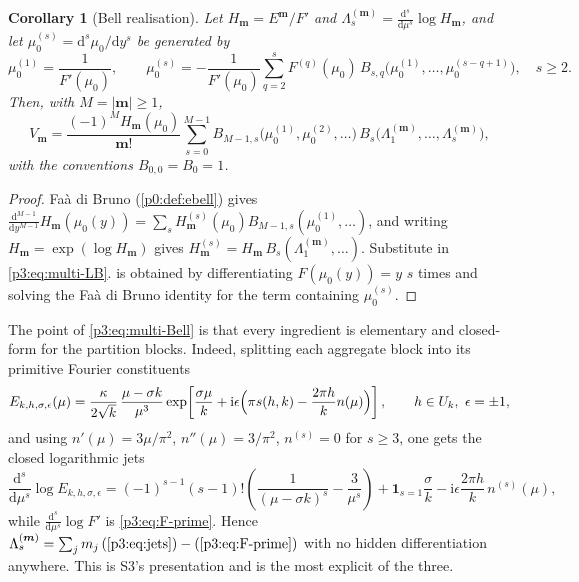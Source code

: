 \documentclass[11pt,a4paper,oneside]{book}
\theoremstyle{plain}
\newtheorem{corollary}[theorem]{Corollary}
\theoremstyle{definition}
\theoremstyle{remark}
\newcommand{\ii}{\mathrm{i}}
\newcommand{\dd}{\mathrm{d}}
\newcommand{\EB}{B}
\begin{document}
\begin{corollary}[Bell realisation]\label{p3:cor:multi-Bell}
Let $H_{\boldsymbol m}=E^{\boldsymbol m}/F'$ and $\Lambda^{(\boldsymbol
m)}_{s}=\frac{\dd^{s}}{\dd\mu^{s}}\log H_{\boldsymbol m}$, and let
$\mu_{0}^{(s)}=\dd^{s}\mu_{0}/\dd y^{s}$ be generated by
\begin{equation}\label{p3:eq:inverse-derivatives}
 \mu_{0}^{(1)}=\frac1{F'(\mu_{0})},\qquad
 \mu_{0}^{(s)}=-\frac1{F'(\mu_{0})}\sum_{q=2}^{s}F^{(q)}(\mu_{0})\,
 \EB_{s,q}\bigl(\mu_{0}^{(1)},\dots,\mu_{0}^{(s-q+1)}\bigr),\quad s\ge2 .
\end{equation}
Then, with $M=|\boldsymbol m|\ge1$,
\begin{equation}\label{p3:eq:multi-Bell}
 V_{\boldsymbol m}=\frac{(-1)^{M}H_{\boldsymbol m}(\mu_{0})}{\boldsymbol m!}
 \sum_{s=0}^{M-1}\EB_{M-1,s}\bigl(\mu_{0}^{(1)},\mu_{0}^{(2)},\dots\bigr)\,
 \EB_{s}\bigl(\Lambda^{(\boldsymbol m)}_{1},\dots,\Lambda^{(\boldsymbol m)}_{s}\bigr),
\end{equation}
with the conventions $\EB_{0,0}=\EB_{0}=1$.
\end{corollary}

\begin{proof}
Fa\`a di Bruno (\cref{p0:def:ebell}) gives $\frac{\dd^{M-1}}{\dd y^{M-1}}H_{\boldsymbol
m}(\mu_{0}(y)) =\sum_{s}H_{\boldsymbol m}^{(s)}(\mu_{0})\EB_{M-1,s}(\mu_{0}^{(1)},\dots)$, and
writing $H_{\boldsymbol m}=\exp(\log H_{\boldsymbol m})$ gives $H_{\boldsymbol
m}^{(s)}=H_{\boldsymbol m}\,\EB_{s}(\Lambda^{(\boldsymbol m)}_{1},\dots)$. Substitute in
\cref{p3:eq:multi-LB}.  is obtained by differentiating
$F(\mu_{0}(y))=y$ $s$ times and solving the Fa\`a di Bruno identity for the term containing
$\mu_{0}^{(s)}$.
\end{proof}

The point of \cref{p3:eq:multi-Bell} is that every ingredient is elementary and closed-form for
the partition blocks. Indeed, splitting each aggregate block into its primitive Fourier
constituents
\begin{equation}\label{p3:eq:primitive-block}
 E_{k,h,\sigma,\epsilon}(\mu)
 =\frac{\kappa}{2\sqrt k}\,\frac{\mu-\sigma k}{\mu^{3}}
 \exp\!\left[\frac{\sigma\mu}{k}
 +\ii\epsilon\Bigl(\pi s(h,k)-\frac{2\pi h}{k}n(\mu)\Bigr)\right],
 \qquad h\in U_{k},\ \epsilon=\pm1,
\end{equation}
and using $n'(\mu)=3\mu/\pi^{2}$, $n''(\mu)=3/\pi^{2}$, $n^{(s)}=0$ for $s\ge3$, one gets the
closed logarithmic jets
\begin{equation}\label{p3:eq:jets}
 \frac{\dd^{s}}{\dd\mu^{s}}\log E_{k,h,\sigma,\epsilon}
 =(-1)^{s-1}(s-1)!\left(\frac1{(\mu-\sigma k)^{s}}-\frac3{\mu^{s}}\right)
 +\mathbf 1_{s=1}\frac\sigma k
 -\ii\epsilon\frac{2\pi h}{k}\,n^{(s)}(\mu),
\end{equation}
while $\frac{\dd^{s}}{\dd\mu^{s}}\log F'$ is \cref{p3:eq:F-prime}. Hence $\Lambda^{(\boldsymbol
m)}_{s}=\sum_{j}m_{j}\,(\text{\cref{p3:eq:jets}}) -(\text{\cref{p3:eq:F-prime}})$ with no hidden
differentiation anywhere. This is S3's presentation and is the most explicit of the three.
\end{document}
